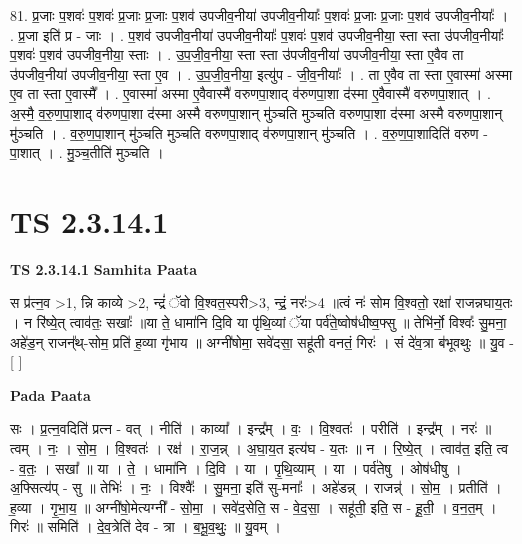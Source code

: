 \documentclass[17pt]{extarticle}
\begin{document}
81. प्र॒जाः प॒शवः॑ प॒शवः॑ प्र॒जाः प्र॒जाः प॒शव॑ उपजीव॒नीया॑ उपजीव॒नीयाः᳚ प॒शवः॑ प्र॒जाः प्र॒जाः प॒शव॑ उपजीव॒नीयाः᳚ । . प्र॒जा इति॑ प्र - जाः । . प॒शव॑ उपजीव॒नीया॑ उपजीव॒नीयाः᳚ प॒शवः॑ प॒शव॑ उपजीव॒नीया॒ स्ता स्ता उ॑पजीव॒नीयाः᳚ प॒शवः॑ प॒शव॑ उपजीव॒नीया॒ स्ताः । . उ॒प॒जी॒व॒नीया॒ स्ता स्ता उ॑पजीव॒नीया॑ उपजीव॒नीया॒ स्ता ए॒वैव ता उ॑पजीव॒नीया॑ उपजीव॒नीया॒ स्ता ए॒व । . उ॒प॒जी॒व॒नीया॒ इत्यु॑प - जी॒व॒नीयाः᳚ । . ता ए॒वैव ता स्ता ए॒वास्मा॑ अस्मा ए॒व ता स्ता ए॒वास्मै᳚ । . ए॒वास्मा॑ अस्मा ए॒वैवास्मै॑ वरुणपा॒शाद् व॑रुणपा॒शा द॑स्मा ए॒वैवास्मै॑ वरुणपा॒शात् । . अ॒स्मै॒ व॒रु॒ण॒पा॒शाद् व॑रुणपा॒शा द॑स्मा अस्मै वरुणपा॒शान् मु॑ञ्चति मुञ्चति वरुणपा॒शा द॑स्मा अस्मै वरुणपा॒शान् मु॑ञ्चति । . व॒रु॒ण॒पा॒शान् मु॑ञ्चति मुञ्चति वरुणपा॒शाद् व॑रुणपा॒शान् मु॑ञ्चति । . व॒रु॒ण॒पा॒शादिति॑ वरुण - पा॒शात् । . मु॒ञ्च॒तीति॑ मुञ्चति । \newline
\pagebreak
{}
\section*{ TS 2.3.14.1 }

\textbf{TS 2.3.14.1 } \newline
\textbf{Samhita Paata} \newline

स प्र॑त्न॒व >1, न्नि काव्ये >2, न्द्रं॑ ॅवो वि॒श्वत॒स्परी>3, न्द्रं॒ नरः॑>4 ॥त्वं नः॑ सोम वि॒श्वतो॒ रक्षा॑ राजन्नघाय॒तः । न रि॑ष्ये॒त् त्वाव॑तः॒ सखाः᳚ ॥या ते॒ धामा॑नि दि॒वि या पृ॑थि॒व्यां ॅया पर्व॑ते॒ष्वोष॑धीष्व॒फ्सु ॥ तेभि॑र्नो॒ विश्वः᳚ सु॒मना॒ अहे॑ड॒न् राजन्᳚थ्-सोम॒ प्रति॑ ह॒व्या गृ॑भाय ॥ अग्नी॑षोमा॒ सवे॑दसा॒ सहू॑ती वनतं॒ गिरः॑ । सं दे॑व॒त्रा ब॑भूवथुः ॥ यु॒व - [  ] \newline

\textbf{Pada Paata} \newline

सः । प्र॒त्न॒वदिति॑ प्रत्न - वत् । नीति॑ । काव्या᳚ । इन्द्र᳚म् । वः॒ । वि॒श्वतः॑ । परीति॑ । इन्द्र᳚म् । नरः॑ ॥ त्वम् । नः॒ । सो॒म॒ । वि॒श्वतः॑ । रक्ष॑ । रा॒ज॒न्न् । अ॒घा॒य॒त इत्य॑घ - य॒तः ॥ न । रि॒ष्ये॒त् । त्वाव॑त॒ इति॒ त्व - व॒तः॒ । सखा᳚ ॥ या । ते॒ । धामा॑नि । दि॒वि । या । पृ॒थि॒व्याम् । या । पर्व॑तेषु । ओष॑धीषु । अ॒फ्सित्य॑प् - सु ॥ तेभिः॑ । नः॒ । विश्वैः᳚ । सु॒मना॒ इति॑ सु-मनाः᳚ । अहे॑डन्न् । राजन्न्॑ । सो॒म॒ । प्रतीति॑ । ह॒व्या । गृ॒भा॒य॒ ॥ अग्नी॑षो॒मेत्यग्नी᳚ - सो॒मा॒ । सवे॑द॒सेति॒ स - वे॒द॒सा॒ । सहू॑ती॒ इति॒ स - हू॒ती॒ । व॒न॒त॒म् । गिरः॑ ॥ समिति॑ । दे॒व॒त्रेति॑ देव - त्रा । ब॒भू॒व॒थुः॒ ॥ यु॒वम् ।  \newline
\end{document}
